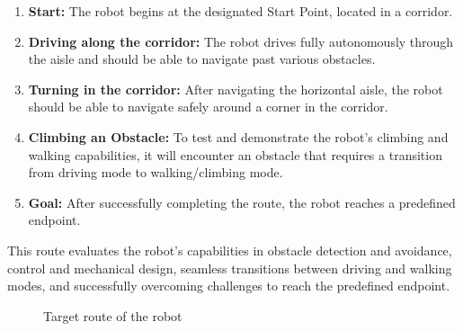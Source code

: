 \documentclass{article}
\begin{document}
\begin{enumerate}
    \item \textbf{Start:} The robot begins at the designated Start Point, located in a corridor.
    \item \textbf{Driving along the corridor:} The robot drives fully autonomously through the aisle and should be able to navigate past various obstacles.
    \item \textbf{Turning in the corridor:} After navigating the horizontal aisle, the robot should be able to navigate safely around a corner in the corridor.
    \item \textbf{Climbing an Obstacle:} To test and demonstrate the robot's climbing and walking capabilities, it will encounter an obstacle that requires a transition from driving mode to walking/climbing mode.
    \item \textbf{Goal:} After successfully completing the route, the robot reaches a predefined endpoint.
\end{enumerate}

This route evaluates the robot's capabilities in obstacle detection and avoidance, control and mechanical design, seamless transitions between driving and walking modes, and successfully overcoming challenges to reach the predefined endpoint.

\begin{figure}[h!]
    \centering
    \caption{Target route of the robot}
    \label{fig:Target_Route}
\end{figure}
\end{document}
